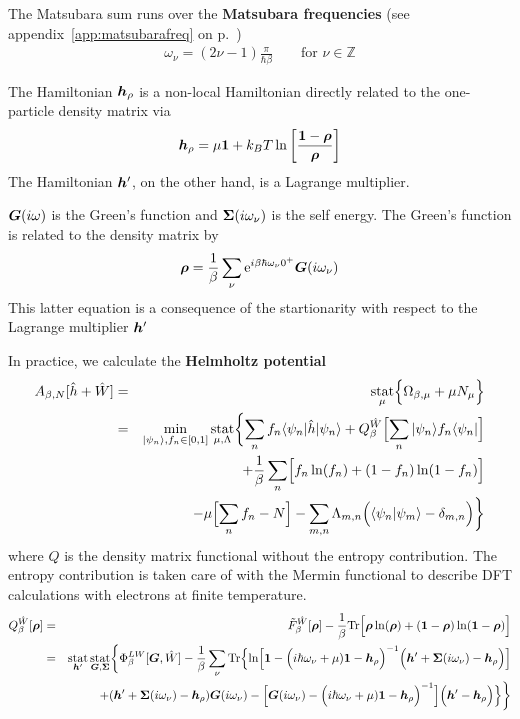 \documentclass[11pt,a4paper]{report}
\begin{document}
The Matsubara sum runs over the \textbf{Matsubara
  frequencies} (see
appendix~\ref{app:matsubarafreq} on p.~\pageref{app:matsubarafreq})
\begin{eqnarray}
\omega_\nu=(2\nu-1)\frac{\pi}{\hbar\beta}
\qquad\text{for $\nu\in\mathbb{Z}$}
\end{eqnarray}

The Hamiltonian $\bm{h}_\rho$ is a non-local Hamiltonian directly
related to the one-particle density matrix via
\begin{eqnarray}
\bm{h}_\rho=\mu\bm{1}+k_BT\ln
\left[\frac{\bm{1}-\bm{\rho}}{\bm{\rho}}\right]
\end{eqnarray}
The Hamiltonian $\bm{h}'$, on the other hand, is a Lagrange multiplier.

$\bm{G}(i\omega)$ is the Green's function and $\bm{\Sigma}(i\omega_\nu)$
is the self energy. The Green's function is related to the density matrix by
\begin{eqnarray}
\bm{\rho}=\frac{1}{\beta}
\sum_\nu\mathrm{e}^{i\beta\hbar\omega_\nu0^+}\bm{G}(i\omega_\nu)
\label{eq:rhoofg}
\end{eqnarray}
This latter equation is a consequence of the startionarity with
respect to the Lagrange multiplier $\bm{h}'$


In practice, we calculate the \textbf{Helmholtz
  potential}
\begin{eqnarray}
A_{\beta,N}[\hat{h}+\hat{W}]
&=&\operatorname*{stat}_\mu\Bigl\lbrace\Omega_{\beta,\mu}+\mu N_\mu\Bigr\rbrace
\nonumber\\
&=&\min_{|\psi_n\rangle,f_n\in[0,1]}\operatorname*{stat}_{\mu,\Lambda}
\biggl\lbrace\sum_n f_n\langle\psi_n|\hat{h}|\psi_n\rangle
+Q_\beta^{\hat{W}}\Bigl[\sum_n|\psi_n\rangle f_n\langle\psi_n|\Bigr]
\nonumber\\
&&+\frac{1}{\beta}\sum_n\Bigl[f_n\ln(f_n)+(1-f_n)\ln(1-f_n)\Bigr]
\nonumber\\
&&
-\mu\Bigl[\sum_n f_n-N\Bigr]
-\sum_{m,n}\Lambda_{m,n}\Bigl(\langle\psi_n|\psi_m\rangle-\delta_{m,n}\Bigr)
\biggr\rbrace
\label{eq:hp}
\end{eqnarray}
where $Q$ is the density matrix functional without the entropy
contribution.  The entropy contribution is taken care of with the
Mermin functional\cite{mermin65_pr137_a1441} to describe DFT
calculations with electrons at finite temperature.
\begin{eqnarray}
Q^{\hat{W}}_\beta[\bm{\rho}]
&=&\tilde{F}^{\hat{W}}_\beta[\bm{\rho}]
-
\frac{1}{\beta}\mathrm{Tr}\Bigl[
\bm{\rho}\ln(\bm{\rho})+(\bm{1}-\bm{\rho})\ln(\bm{1}-\bm{\rho})\Bigr]
\nonumber\\
&=&
\operatorname*{stat}_{\bm{h}'}\operatorname*{stat}_{\bm{G},\bm{\Sigma}}
\biggl\lbrace
\Phi^{LW}_\beta[\bm{G},\hat{W}]
-\frac{1}{\beta}\sum_\nu\mathrm{Tr}\Bigl\lbrace
\ln\Bigl[
\bm{1}-
\Bigl(i\hbar\omega_\nu+\mu)\bm{1}-\bm{h}_{\rho}\Bigr)^{-1}
\Bigl(\bm{h}'+\bm{\Sigma}(i\omega_\nu)-\bm{h}_{\rho}\Bigr)
\Bigr]
\nonumber\\&&
+(\bm{h}'+\bm{\Sigma}(i\omega_\nu)-\bm{h}_\rho)\bm{G}(i\omega_\nu)
-
\Bigl[
\bm{G}(i\omega_\nu)
-\Bigl(i\hbar\omega_\nu+\mu)\bm{1}-\bm{h}_{\rho}\Bigr)^{-1}
\Bigr]
\Bigl(\bm{h}'-\bm{h}_\rho\Bigr)\Bigr\rbrace
\biggr\rbrace
\label{eq:dmfQgreen}
\end{eqnarray}
\end{document}
